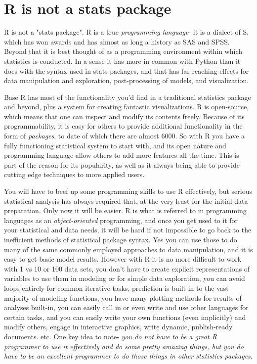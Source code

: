 \documentclass[english,nohyper,titlepage]{tufte-handout}\usepackage[]{graphicx}\usepackage[]{color}
\begin{document}
\section{R is not a stats package}
R is not a "stats package".  R is a true \emph{programming language}- it is a dialect of S, which has won awards and has almost as long a history as SAS and SPSS.  Beyond that it is best thought of as a programming environment within which statistics is conducted.  In a sense it has more in common with Python than it does with the syntax used in stats packages, and that has far-reaching effects for data manipulation and exploration, post-processing of models, and visualization.

Base R has most of the functionality you'd find in a traditional statistics package and beyond, plus a system for creating fantastic visualizations.  R is open-source, which means that one can inspect and modify its contents freely.  Because of its programmability, it is easy for others to provide additional functionality in the form of \emph{packages}, to date of which there are almost 6000.  So with R you have a fully functioning statistical system to start with, and its open nature and programming language allow others to add more features all the time.  This is part of the reason for its popularity, as well as it always being able to provide cutting edge techniques to more applied users.

You will have to beef up some programming skills to use R effectively, but serious statistical analysis has always required that, at the very least for the initial data preparation.  Only now it will be easier.  R is what is referred to in programming languages as an \emph{object-oriented} programming, and once you get used to it for your statistical and data needs, it will be hard if not impossible to go back to the inefficient methods of statistical package syntax.  Yes you can use those to do many of the same commonly employed approaches to data manipulation, and it is easy to get basic model results. However with R it is no more difficult to work with 1 vs 10 or 100 data sets, you don't have to create explicit representations of variables to use them in modeling or for simple data exploration, you can avoid loops entirely for common iterative tasks, prediction is built in to the vast majority of modeling functions, you have many plotting methods for results of analyses built-in, you can easily call in or even write and use other languages for certain tasks, and you can easily write your own functions (even implicitly) and modify others, engage in interactive graphics, write dynamic, publish-ready documents. etc.  One key idea to note- \emph{you do not have to be a great R programmer to use it effectively and do some pretty amazing things, but you do have to be an excellent programmer to do those things in other statistics packages}.
\end{document}
